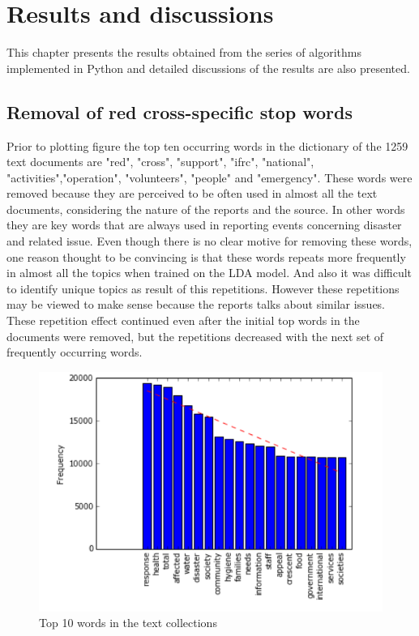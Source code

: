 \chapter{Results and discussions}
This chapter presents the results obtained from the series of algorithms implemented in Python and detailed discussions of the results are also presented. 
\section{Removal of red cross-specific stop words}
Prior to plotting figure \text{\eqref{Fig. 4.1}} the top ten occurring words in the dictionary of the 1259 text documents are "red", "cross",  "support", "ifrc", "national", "activities","operation", "volunteers", "people" and "emergency". These words were removed because they are perceived  to be often used in almost all the text documents, considering the nature of the reports and the source. In other words they are key words that are always used in reporting events concerning disaster and  related issue. Even though there is no clear motive for removing these words, one reason thought to be convincing is that these words repeats more frequently in almost all the topics when trained on  the LDA model. And also it was difficult to identify unique topics as result of this repetitions. However these repetitions may be viewed to make sense because the reports talks about similar issues. These repetition effect continued even after the initial top words in the documents were removed, but  the repetitions decreased with the next set of frequently occurring words.
\begin{figure}[hbtp]
\centering
\includegraphics[scale=0.80]{c4_1.png}
\caption{Top 10 words  in the text collections}\label{Fig. 4.1}
\end{figure}
 
